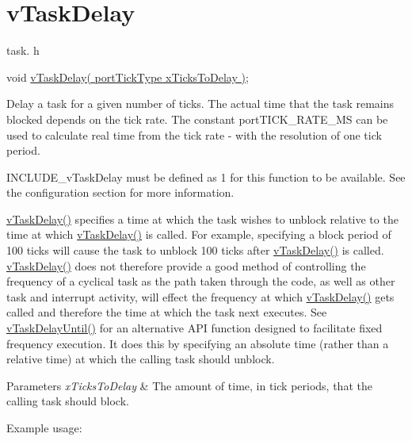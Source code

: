 \hypertarget{group__v_task_delay}{\section{v\-Task\-Delay}
\label{group__v_task_delay}
}
task. h 
\begin{DoxyPre}void \hyperlink{win32_2win32_2_libraries_2_free_r_t_o_s_2_source_2tasks_8c_a688c67e5456ec7c23cc2ee184d26d557}{vTaskDelay( portTickType xTicksToDelay )};\end{DoxyPre}


Delay a task for a given number of ticks. The actual time that the task remains blocked depends on the tick rate. The constant port\-T\-I\-C\-K\-\_\-\-R\-A\-T\-E\-\_\-\-M\-S can be used to calculate real time from the tick rate -\/ with the resolution of one tick period.

I\-N\-C\-L\-U\-D\-E\-\_\-v\-Task\-Delay must be defined as 1 for this function to be available. See the configuration section for more information.

\hyperlink{_common_2_libraries_2_free_r_t_o_s_2_source_2include_2task_8h_a3fc5adc340b17cb07c12ffa90d7bb8f3}{v\-Task\-Delay()} specifies a time at which the task wishes to unblock relative to the time at which \hyperlink{_common_2_libraries_2_free_r_t_o_s_2_source_2include_2task_8h_a3fc5adc340b17cb07c12ffa90d7bb8f3}{v\-Task\-Delay()} is called. For example, specifying a block period of 100 ticks will cause the task to unblock 100 ticks after \hyperlink{_common_2_libraries_2_free_r_t_o_s_2_source_2include_2task_8h_a3fc5adc340b17cb07c12ffa90d7bb8f3}{v\-Task\-Delay()} is called. \hyperlink{_common_2_libraries_2_free_r_t_o_s_2_source_2include_2task_8h_a3fc5adc340b17cb07c12ffa90d7bb8f3}{v\-Task\-Delay()} does not therefore provide a good method of controlling the frequency of a cyclical task as the path taken through the code, as well as other task and interrupt activity, will effect the frequency at which \hyperlink{_common_2_libraries_2_free_r_t_o_s_2_source_2include_2task_8h_a3fc5adc340b17cb07c12ffa90d7bb8f3}{v\-Task\-Delay()} gets called and therefore the time at which the task next executes. See \hyperlink{_common_2_libraries_2_free_r_t_o_s_2_source_2include_2task_8h_a3033ef5b1abc8618ea205d1082b21bb6}{v\-Task\-Delay\-Until()} for an alternative A\-P\-I function designed to facilitate fixed frequency execution. It does this by specifying an absolute time (rather than a relative time) at which the calling task should unblock.


\begin{DoxyParams}{Parameters}
{\em x\-Ticks\-To\-Delay} & The amount of time, in tick periods, that the calling task should block.\\
\hline
\end{DoxyParams}
Example usage\-:

